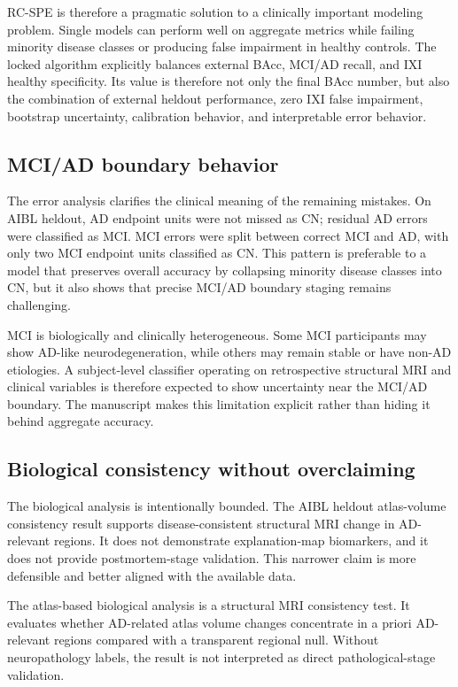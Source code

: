 RC-SPE is therefore a pragmatic solution to a clinically important modeling problem. Single models can perform well on aggregate metrics while failing minority disease classes or producing false impairment in healthy controls. The locked algorithm explicitly balances external BAcc, MCI/AD recall, and IXI healthy specificity. Its value is therefore not only the final BAcc number, but also the combination of external heldout performance, zero IXI false impairment, bootstrap uncertainty, calibration behavior, and interpretable error behavior.

\subsection{MCI/AD boundary behavior}
\label{sec:discussion_errors}

The error analysis clarifies the clinical meaning of the remaining mistakes. On AIBL heldout, AD endpoint units were not missed as CN; residual AD errors were classified as MCI. MCI errors were split between correct MCI and AD, with only two MCI endpoint units classified as CN. This pattern is preferable to a model that preserves overall accuracy by collapsing minority disease classes into CN, but it also shows that precise MCI/AD boundary staging remains challenging.

MCI is biologically and clinically heterogeneous. Some MCI participants may show AD-like neurodegeneration, while others may remain stable or have non-AD etiologies. A subject-level classifier operating on retrospective structural MRI and clinical variables is therefore expected to show uncertainty near the MCI/AD boundary. The manuscript makes this limitation explicit rather than hiding it behind aggregate accuracy.

\subsection{Biological consistency without overclaiming}
\label{sec:discussion_bio}

The biological analysis is intentionally bounded. The AIBL heldout atlas-volume consistency result supports disease-consistent structural MRI change in AD-relevant regions. It does not demonstrate explanation-map biomarkers, and it does not provide postmortem-stage validation. This narrower claim is more defensible and better aligned with the available data.

The atlas-based biological analysis is a structural MRI consistency test. It evaluates whether AD-related atlas volume changes concentrate in a priori AD-relevant regions compared with a transparent regional null. Without neuropathology labels, the result is not interpreted as direct pathological-stage validation.

